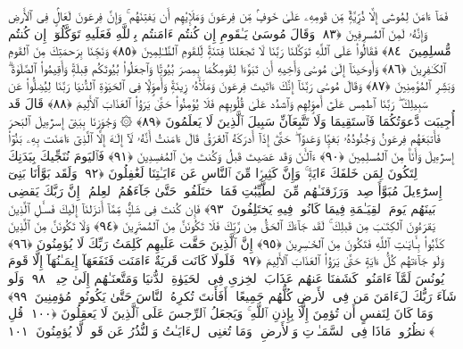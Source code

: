  فَمَآ ءَامَنَ لِمُوسَىٰٓ إِلَّا ذُرِّيَّةٌۭ مِّن قَومِهِۦ عَلَىٰ خَوفٍۢ مِّن فِرعَونَ وَمَلَإِي۟هِم أَن يَفتِنَهُم ۚ وَإِنَّ فِرعَونَ لَعَالٍۢ فِى ٱلأَرضِ وَإِنَّهُۥ لَمِنَ ٱلمُسرِفِينَ ﴿٨٣﴾
 وَقَالَ مُوسَىٰ يَـٰقَومِ إِن كُنتُم ءَامَنتُم بِٱللَّهِ فَعَلَيهِ تَوَكَّلُوٓا۟ إِن كُنتُم مُّسلِمِينَ ﴿٨٤﴾
 فَقَالُوا۟ عَلَى ٱللَّهِ تَوَكَّلنَا رَبَّنَا لَا تَجعَلنَا فِتنَةًۭ لِّلقَومِ ٱلظَّـٰلِمِينَ ﴿٨٥﴾
 وَنَجِّنَا بِرَحمَتِكَ مِنَ ٱلقَومِ ٱلكَـٰفِرِينَ ﴿٨٦﴾
 وَأَوحَينَآ إِلَىٰ مُوسَىٰ وَأَخِيهِ أَن تَبَوَّءَا لِقَومِكُمَا بِمِصرَ بُيُوتًۭا وَٱجعَلُوا۟ بُيُوتَكُم قِبلَةًۭ وَأَقِيمُوا۟ ٱلصَّلَوٰةَ ۗ وَبَشِّرِ ٱلمُؤمِنِينَ ﴿٨٧﴾
 وَقَالَ مُوسَىٰ رَبَّنَآ إِنَّكَ ءَاتَيتَ فِرعَونَ وَمَلَأَهُۥ زِينَةًۭ وَأَموَٟلًۭا فِى ٱلحَيَوٰةِ ٱلدُّنيَا رَبَّنَا لِيُضِلُّوا۟ عَن سَبِيلِكَ ۖ رَبَّنَا ٱطمِس عَلَىٰٓ أَموَٟلِهِم وَٱشدُد عَلَىٰ قُلُوبِهِم فَلَا يُؤمِنُوا۟ حَتَّىٰ يَرَوُا۟ ٱلعَذَابَ ٱلأَلِيمَ ﴿٨٨﴾
 قَالَ قَد أُجِيبَت دَّعوَتُكُمَا فَٱستَقِيمَا وَلَا تَتَّبِعَآنِّ سَبِيلَ ٱلَّذِينَ لَا يَعلَمُونَ ﴿٨٩﴾
 ۞ وَجَٰوَزنَا بِبَنِىٓ إِسرَٰٓءِيلَ ٱلبَحرَ فَأَتبَعَهُم فِرعَونُ وَجُنُودُهُۥ بَغيًۭا وَعَدوًا ۖ حَتَّىٰٓ إِذَآ أَدرَكَهُ ٱلغَرَقُ قَالَ ءَامَنتُ أَنَّهُۥ لَآ إِلَـٰهَ إِلَّا ٱلَّذِىٓ ءَامَنَت بِهِۦ بَنُوٓا۟ إِسرَٰٓءِيلَ وَأَنَا۠ مِنَ ٱلمُسلِمِينَ ﴿٩٠﴾
 ءَآلـَٰٔنَ وَقَد عَصَيتَ قَبلُ وَكُنتَ مِنَ ٱلمُفسِدِينَ ﴿٩١﴾
 فَٱليَومَ نُنَجِّيكَ بِبَدَنِكَ لِتَكُونَ لِمَن خَلفَكَ ءَايَةًۭ ۚ وَإِنَّ كَثِيرًۭا مِّنَ ٱلنَّاسِ عَن ءَايَـٰتِنَا لَغَٰفِلُونَ ﴿٩٢﴾
 وَلَقَد بَوَّأنَا بَنِىٓ إِسرَٰٓءِيلَ مُبَوَّأَ صِدقٍۢ وَرَزَقنَـٰهُم مِّنَ ٱلطَّيِّبَٰتِ فَمَا ٱختَلَفُوا۟ حَتَّىٰ جَآءَهُمُ ٱلعِلمُ ۚ إِنَّ رَبَّكَ يَقضِى بَينَهُم يَومَ ٱلقِيَـٰمَةِ فِيمَا كَانُوا۟ فِيهِ يَختَلِفُونَ ﴿٩٣﴾
 فَإِن كُنتَ فِى شَكٍّۢ مِّمَّآ أَنزَلنَآ إِلَيكَ فَسـَٔلِ ٱلَّذِينَ يَقرَءُونَ ٱلكِتَـٰبَ مِن قَبلِكَ ۚ لَقَد جَآءَكَ ٱلحَقُّ مِن رَّبِّكَ فَلَا تَكُونَنَّ مِنَ ٱلمُمتَرِينَ ﴿٩٤﴾
 وَلَا تَكُونَنَّ مِنَ ٱلَّذِينَ كَذَّبُوا۟ بِـَٔايَـٰتِ ٱللَّهِ فَتَكُونَ مِنَ ٱلخَـٰسِرِينَ ﴿٩٥﴾
 إِنَّ ٱلَّذِينَ حَقَّت عَلَيهِم كَلِمَتُ رَبِّكَ لَا يُؤمِنُونَ ﴿٩٦﴾
 وَلَو جَآءَتهُم كُلُّ ءَايَةٍ حَتَّىٰ يَرَوُا۟ ٱلعَذَابَ ٱلأَلِيمَ ﴿٩٧﴾
 فَلَولَا كَانَت قَريَةٌ ءَامَنَت فَنَفَعَهَآ إِيمَـٰنُهَآ إِلَّا قَومَ يُونُسَ لَمَّآ ءَامَنُوا۟ كَشَفنَا عَنهُم عَذَابَ ٱلخِزىِ فِى ٱلحَيَوٰةِ ٱلدُّنيَا وَمَتَّعنَـٰهُم إِلَىٰ حِينٍۢ ﴿٩٨﴾
 وَلَو شَآءَ رَبُّكَ لَءَامَنَ مَن فِى ٱلأَرضِ كُلُّهُم جَمِيعًا ۚ أَفَأَنتَ تُكرِهُ ٱلنَّاسَ حَتَّىٰ يَكُونُوا۟ مُؤمِنِينَ ﴿٩٩﴾
 وَمَا كَانَ لِنَفسٍ أَن تُؤمِنَ إِلَّا بِإِذنِ ٱللَّهِ ۚ وَيَجعَلُ ٱلرِّجسَ عَلَى ٱلَّذِينَ لَا يَعقِلُونَ ﴿١٠٠﴾
 قُلِ ٱنظُرُوا۟ مَاذَا فِى ٱلسَّمَـٰوَٟتِ وَٱلأَرضِ ۚ وَمَا تُغنِى ٱلءَايَـٰتُ وَٱلنُّذُرُ عَن قَومٍۢ لَّا يُؤمِنُونَ ﴿١٠١﴾
